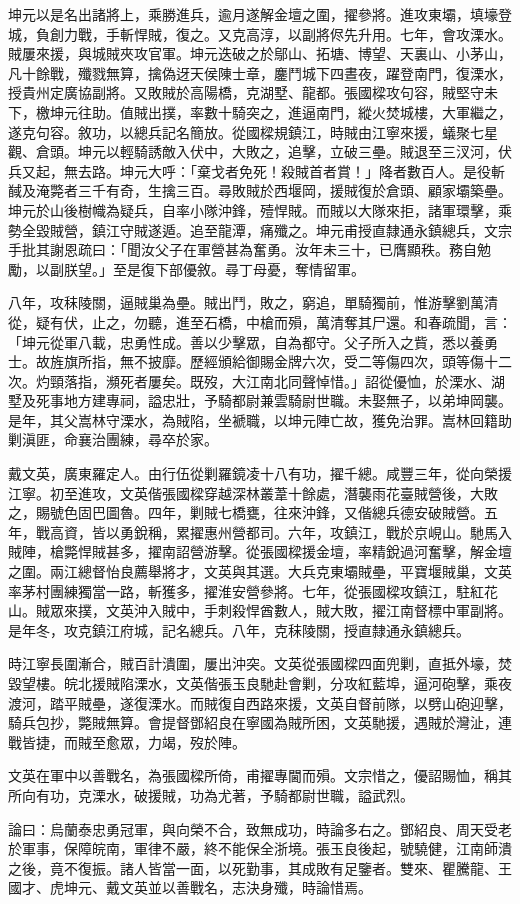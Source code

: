 \begin{pinyinscope}
坤元以是名出諸將上，乘勝進兵，逾月遂解金壇之圍，擢參將。進攻東壩，填壕登城，負創力戰，手斬悍賊，復之。又克高淳，以副將侭先升用。七年，會攻溧水。賊屢來援，與城賊夾攻官軍。坤元迭破之於鄔山、拓塘、博望、天裏山、小茅山，凡十餘戰，殲戮無算，擒偽迓天侯陳士章，鏖鬥城下四晝夜，躍登南門，復溧水，授貴州定廣協副將。又敗賊於高陽橋，克湖墅、龍都。張國樑攻句容，賊堅守未下，檄坤元往助。值賊出撲，率數十騎突之，進逼南門，縱火焚城樓，大軍繼之，遂克句容。敘功，以總兵記名簡放。從國樑規鎮江，時賊由江寧來援，蟻聚七星觀、倉頭。坤元以輕騎誘敵入伏中，大敗之，追擊，立破三壘。賊退至三汊河，伏兵又起，無去路。坤元大呼：「棄戈者免死！殺賊首者賞！」降者數百人。是役斬馘及淹斃者三千有奇，生擒三百。尋敗賊於西堰岡，援賊復於倉頭、顧家壩築壘。坤元於山後樹幟為疑兵，自率小隊沖鋒，殪悍賊。而賊以大隊來拒，諸軍環擊，乘勢全毀賊營，鎮江守賊遂遁。追至龍潭，痛殲之。坤元甫授直隸通永鎮總兵，文宗手批其謝恩疏曰：「聞汝父子在軍營甚為奮勇。汝年未三十，已膺顯秩。務自勉勵，以副朕望。」至是復下部優敘。尋丁母憂，奪情留軍。

八年，攻秣陵關，逼賊巢為壘。賊出鬥，敗之，窮追，單騎獨前，惟游擊劉萬清從，疑有伏，止之，勿聽，進至石橋，中槍而殞，萬清奪其尸還。和春疏聞，言：「坤元從軍八載，忠勇性成。善以少擊眾，自為都守。父子所入之貲，悉以養勇士。故旌旗所指，無不披靡。歷經頒給御賜金牌六次，受二等傷四次，頭等傷十二次。灼頸落指，瀕死者屢矣。既歿，大江南北同聲悼惜。」詔從優恤，於溧水、湖墅及死事地方建專祠，謚忠壯，予騎都尉兼雲騎尉世職。未娶無子，以弟坤岡襲。是年，其父嵩林守溧水，為賊陷，坐褫職，以坤元陣亡故，獲免治罪。嵩林回籍助剿滇匪，命襄治團練，尋卒於家。

戴文英，廣東羅定人。由行伍從剿羅鏡凌十八有功，擢千總。咸豐三年，從向榮援江寧。初至進攻，文英偕張國樑穿越深林叢葦十餘處，潛襲雨花臺賊營後，大敗之，賜號色固巴圖魯。四年，剿賊七橋甕，往來沖鋒，又偕總兵德安破賊營。五年，戰高資，皆以勇銳稱，累擢惠州營都司。六年，攻鎮江，戰於京峴山。馳馬入賊陣，槍斃悍賊甚多，擢南詔營游擊。從張國樑援金壇，率精銳過河奮擊，解金壇之圍。兩江總督怡良薦舉將才，文英與其選。大兵克東壩賊壘，平寶堰賊巢，文英率茅村團練獨當一路，斬獲多，擢淮安營參將。七年，從張國樑攻鎮江，駐紅花山。賊眾來撲，文英沖入賊中，手刺殺悍酋數人，賊大敗，擢江南督標中軍副將。是年冬，攻克鎮江府城，記名總兵。八年，克秣陵關，授直隸通永鎮總兵。

時江寧長圍漸合，賊百計潰圍，屢出沖突。文英從張國樑四面兜剿，直抵外壕，焚毀望樓。皖北援賊陷溧水，文英偕張玉良馳赴會剿，分攻紅藍埠，逼河砲擊，乘夜渡河，踏平賊壘，遂復溧水。而賊復自西路來援，文英自督前隊，以劈山砲迎擊，騎兵包抄，斃賊無算。會提督鄧紹良在寧國為賊所困，文英馳援，遇賊於灣沚，連戰皆捷，而賊至愈眾，力竭，歿於陣。

文英在軍中以善戰名，為張國樑所倚，甫擢專閫而殞。文宗惜之，優詔賜恤，稱其所向有功，克溧水，破援賊，功為尤著，予騎都尉世職，謚武烈。

論曰：烏蘭泰忠勇冠軍，與向榮不合，致無成功，時論多右之。鄧紹良、周天受老於軍事，保障皖南，軍律不嚴，終不能保全浙境。張玉良後起，號驍健，江南師潰之後，竟不復振。諸人皆當一面，以死勤事，其成敗有足鑒者。雙來、瞿騰龍、王國才、虎坤元、戴文英並以善戰名，志決身殲，時論惜焉。


\end{pinyinscope}